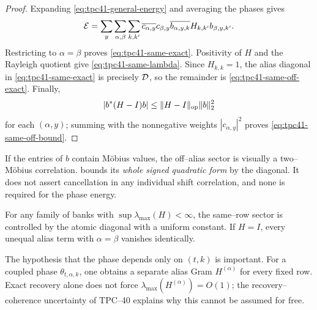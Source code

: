 \begin{proof}
Expanding \eqref{eq:tpc41-general-energy} and averaging the phases gives
\begin{equation}
 \mathcal E
 =\sum_y\sum_{\alpha,\beta}\sum_{k,k'}
 \overline{c_{\alpha,y}}c_{\beta,y}
 \overline{b_{\alpha,y,k}}H_{k,k'}b_{\beta,y,k'}.
 \label{eq:tpc41-general-expanded}
\end{equation}
Restricting to \(\alpha=\beta\) proves
\eqref{eq:tpc41-same-exact}.  Positivity of \(H\) and the Rayleigh
quotient give \eqref{eq:tpc41-same-lambda}.  Since \(H_{k,k}=1\), the
alias diagonal in \eqref{eq:tpc41-same-exact} is precisely \(\mathcal D\), so
the remainder is \eqref{eq:tpc41-same-off-exact}.  Finally,
\[
 |b^*(H-I)b|\le\|H-I\|_{\operatorname{op}}\|b\|_2^2
\]
for each \((\alpha,y)\); summing with the nonnegative weights
\(|c_{\alpha,y}|^2\) proves \eqref{eq:tpc41-same-off-bound}.
\end{proof}

\begin{remark}
\label{rem:tpc41-no-mobius-needed}
If the entries of \(b\) contain M\"obius values, the off--alias sector is
visually a two--M\"obius correlation.
 bounds its \emph{whole signed
quadratic form} by the diagonal.  It does not assert cancellation in any
individual shift correlation, and none is required for the phase energy.
\end{remark}

\begin{corollary}
\label{cor:tpc41-bounded-Gram}
For any family of banks with
\(\sup\lambda_{\max}(H)<\infty\), the same--row sector is controlled by
the atomic diagonal with a uniform constant.  If \(H=I\), every unequal
alias term with \(\alpha=\beta\) vanishes identically.
\end{corollary}

The hypothesis that the phase depends only on \((t,k)\) is important.
For a coupled phase \(\theta_{t,\alpha,k}\), one obtains a separate alias
Gram \(H^{(\alpha)}\) for every fixed row.  Exact recovery alone does not
force \(\lambda_{\max}(H^{(\alpha)})=O(1)\); the recovery--coherence
uncertainty of TPC--40 explains why this cannot be assumed for free.
